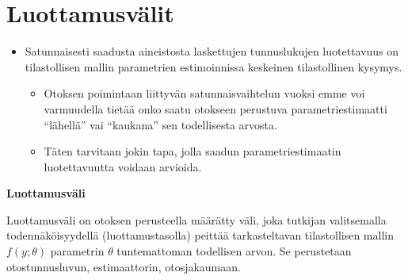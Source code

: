 \documentclass[
]{book}
\providecommand{\tightlist}{%
  \setlength{\itemsep}{0pt}\setlength{\parskip}{0pt}}
\begin{document}
\hypertarget{alaluku96}{%
\section{Luottamusvälit}\label{alaluku96}}

\begin{itemize}
\tightlist
\item
  Satunnaisesti saadusta aineistosta laskettujen tunnuslukujen luotettavuus on tilastollisen mallin parametrien estimoinnissa keskeinen tilastollinen kysymys.

  \begin{itemize}
  \tightlist
  \item
    Otoksen poimintaan liittyvän satunnaisvaihtelun vuoksi emme voi varmuudella tietää onko saatu otokseen perustuva parametriestimaatti ``lähellä'' vai ``kaukana'' sen todellisesta arvosta.
  \item
    Täten tarvitaan jokin tapa, jolla saadun parametriestimaatin luotettavuutta voidaan arvioida.
  \end{itemize}
\end{itemize}

\begin{defblock}{}
\textbf{Luottamusväli}

Luottamusväli on otoksen perusteella määrätty väli, joka tutkijan valitsemalla todennäköisyydellä (luottamustasolla) peittää tarkasteltavan tilastollisen mallin \(f(y;\theta)\) parametrin \(\theta\) tuntemattoman todellisen arvon. Se perustetaan otostunnusluvun, estimaattorin, otosjakaumaan.

\end{defblock}
\end{document}
